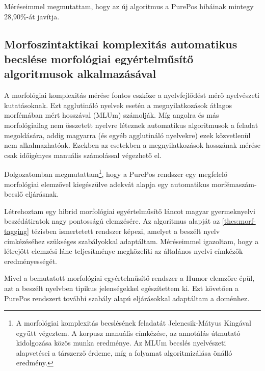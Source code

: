 Méréseimmel megmutattam, hogy az új algoritmus a PurePos hibáinak mintegy 28,90\%-át javítja. 

\subsection{Morfoszintaktikai komplexitás automatikus becslése morfológiai egyértelműsítő algoritmusok alkalmazásával}
\label{thes:mlu}

A morfológiai komplexitás mérése fontos eszköze a nyelvfejlődést mérő nyelvészeti kutatásoknak.
Ezt agglutináló nyelvek esetén a megnyilatkozások átlagos morfémában mért hosszával (MLUm) számolják.
Míg angolra és más morfológiailag nem összetett nyelvre léteznek automatikus algoritmusok a feladat megoldására, addig magyarra (és egyéb agglutináló nyelvekre) ezek közvetlenül nem alkalmazhatóak. 
Ezekben az esetekben a megnyilatkozások hosszának mérése csak időigényes manuális számolással végezhető el.

Dolgozatomban megmutattam\footnote{A morfológiai komplexitás becslésének feladatát Jelencsik-Mátyus Kingával együtt végeztem. A korpusz manuális címkézése, az annotálás útmutató kidolgozása közös munka eredménye. Az MLUm becslés nyelvészeti alapvetései a társzerző érdeme, míg a folyamat algoritmizálása önálló eredmény.}, hogy a PurePos rendszer egy megfelelő morfológiai elemzővel kiegészülve adekvát alapja egy automatikus morfémaszám-becslő eljárásnak. %

\begin{core}
\begin{thesis}
\label{thes:spoken-morf-tagging}
Létrehoztam egy  hibrid morfológiai egyértelműsítő láncot magyar gyermeknyelvi beszédátiratok nagy pontosságú elemzésére. 
Az algoritmus alapját az \ref{thes:morf-tagging} tézisben ismertetett rendszer képezi, amelyet a beszélt nyelv címkézéséhez szükséges szabályokkal adaptáltam. 
Méréseimmel igazoltam, hogy a létrejött elemzési lánc teljesítménye megközelíti az általános nyelvi címkézők eredményességét.
\end{thesis}

\begin{pub}
\cite{Matyus2014,Orosz2014c}
\end{pub}
\end{core}

Mivel a bemutatott morfológiai egyértelműsítő rendszer a Humor elemzőre épül, azt a beszélt nyelvben tipikus jelenségekkel egészítettem ki. 
Ezt követően a PurePos rendszert további szabály alapú eljárásokkal adaptáltam a doménhez.


